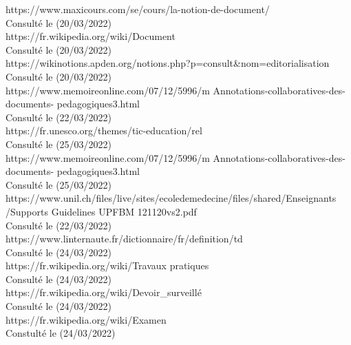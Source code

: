 \documentclass[12pt]{report}
\begin{document}
\newpage
\listoffigures
\newpage
\listoftables
\newpage
\footnotesize
 \begin{thebibliography}{99}

 https://www.maxicours.com/se/cours/la-notion-de-document/
		 	\\Consulté le (20/03/2022)\\	

 https://fr.wikipedia.org/wiki/Document
			\\Consulté le (20/03/2022)\\

 https://wikinotions.apden.org/notions.php?p=consult\&nom=editorialisation
			\\Consulté le (20/03/2022)\\


 https://www.memoireonline.com/07/12/5996/m Annotations-collaboratives-des-documents-
pedagogiques3.html 
			\\Consulté le (22/03/2022)\\


 https://fr.unesco.org/themes/tic-education/rel
			\\Consulté le (25/03/2022)\\

 https://www.memoireonline.com/07/12/5996/m Annotations-collaboratives-des-documents-
pedagogiques3.html
			\\Consulté le (25/03/2022)\\

 https://www.unil.ch/files/live/sites/ecoledemedecine/files/shared/Enseignants
/Supports Guidelines UPFBM 121120vs2.pdf
			\\Consulté le (22/03/2022)\\

 https://www.linternaute.fr/dictionnaire/fr/definition/td
			\\Consulté le (24/03/2022)\\

 https://fr.wikipedia.org/wiki/Travaux pratiques
			\\Consulté le (24/03/2022)\\

 https://fr.wikipedia.org/wiki/Devoir\_surveillé
			\\Consulté le (24/03/2022)\\

 https://fr.wikipedia.org/wiki/Examen
			\\Constulté le (24/03/2022)\\


\end{thebibliography}
\end{document}

